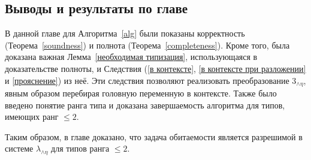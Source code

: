 \documentclass[../main.tex]{subfiles}
\begin{document}
\subsection{Выводы и результаты по главе}

В данной главе для Алгоритма~\ref{alg} были показаны корректность (Теорема~\ref{soundness}) и полнота (Теорема~\ref{completeness}). Кроме того, была доказана важная Лемма~\ref{необходимая типизация}, использующаяся в доказательстве полноты, и Следствия (\ref{в контексте}, \ref{в контексте при разложении} и \ref{прояснение}) из неё. Эти следствия позволяют реализовать преобразование $3_{\wedge \eta}$, явным образом перебирая головную переменную в контексте. Также было введено понятие ранга типа и доказана завершаемость алгоритма для типов, имеющих ранг $\leqslant 2$.

Таким образом, в главе доказано, что задача обитаемости является разрешимой в системе $\lambda_{\wedge \eta}$ для типов ранга $\leqslant 2$.
\end{document}
